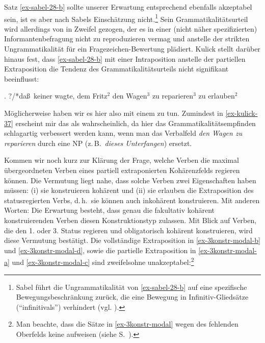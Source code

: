 Satz \ref{ex-sabel-28-b} sollte unserer Erwartung entsprechend ebenfalls akzeptabel sein, ist es aber nach Sabels Einschätzung nicht.\footnote{Sabel führt die Ungrammatikalität von \ref{ex-sabel-28-b} auf eine spezifische Bewegungsbeschränkung zurück, die eine Bewegung in Infinitiv-Gliedsätze ("`infinitivals"') verhindert (vgl. \citealt[418]{Sabel:95}). } Sein Grammatikalitätsurteil wird allerdings von \cite{Kulick:00} in Zweifel gezogen, der es in einer (nicht näher spezifizierten) Informantenbefragung nicht zu reproduzieren vermag und anstelle der strikten Ungrammatikalität für ein Fragezeichen-Bewertung plädiert. Kulick stellt darüber hinaus fest, dass \ref{ex-sabel-28-b} mit einer Intraposition anstelle der partiellen Extraposition die Tendenz des Grammatikalitätsurteils nicht signifikant beeinflusst:

\ex. ?/*\label{ex-kulick-37}da\ss\ keiner wagte, dem Fritz$^2$ den Wagen$^3$ zu reparieren$^3$ zu erlauben$^2$ \\ \citep[(37)]{Kulick:00} 

Möglicherweise haben wir es hier also mit einem  zu tun. Zumindest in \ref{ex-kulick-37} erscheint mir das als wahrscheinlich, da hier das Grammatikalitätsempfinden schlagartig verbessert werden kann, wenn man das Verbalfeld {\it den Wagen zu reparieren} durch  eine NP (z.\,B.\ {\it dieses Unterfangen}) ersetzt. 


Kommen wir noch kurz zur Klärung der Frage, welche Verben die maximal übergeordneten Verben eines partiell extraponierten Kohärenzfelds regieren können. Die Vermutung liegt nahe, dass solche Verben zwei Eigenschaften haben müssen: (i) sie konstruieren kohärent und (ii) sie erlauben die Extraposition des statusregierten Verbs, d.\,h.\ sie können auch inkohärent konstruieren. Mit anderen Worten: Die Erwartung besteht, dass genau die fakultativ kohärent konstruierenden Verben diesen Konstruktionstyp zulassen. Mit Blick auf Verben, die den 1. oder 3. Status regieren und obligatorisch kohärent konstruieren, wird diese Vermutung bestätigt. Die vollständige Extraposition in \ref{ex-3konstr-modal-b} und \ref{ex-3konstr-modal-d}, sowie die partielle Extraposition in \ref{ex-3konstr-modal-a} und \ref{ex-3konstr-modal-c} sind zweifelsohne unakzeptabel:\footnote{Man beachte, dass die Sätze in \ref{ex-3konstr-modal} wegen des fehlenden Oberfelds keine  aufweisen (siehe S.~\pageref{sec-linksstellung}). } 

